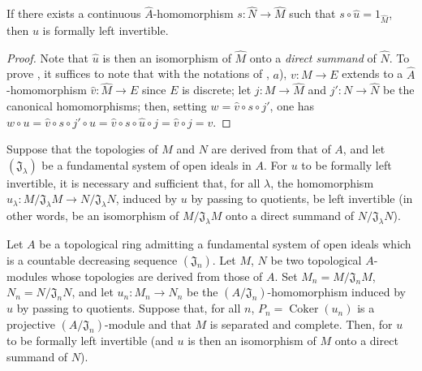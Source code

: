 \begin{corollary}[19.1.6]
\label{0.19.1.6}
If there exists a continuous $\widehat{A}$-homomorphism $s:\widehat{N}\to\widehat{M}$ such that $s\circ\hat{u}=1_{\widehat{M}}$, then $u$ is formally left invertible.
\end{corollary}

\begin{proof}
Note that $\hat{u}$ is then an isomorphism of $\widehat{M}$ onto a \emph{direct summand} of $\widehat{N}$.
To prove , it suffices to note that with the notations of , $a$), $v:M\to E$ extends to a $\widehat{A}$-homomorphism $\hat{v}:\widehat{M}\to E$ since $E$ is discrete;
let $j:M\to\widehat{M}$ and $j':N\to\widehat{N}$ be the canonical homomorphisms;
then, setting $w=\hat{v}\circ s\circ j'$, one has $w\circ u=\hat{v}\circ s\circ j'\circ u=\hat{v}\circ s\circ\hat{u}\circ j=\hat{v}\circ j=v$.
\end{proof}

\begin{corollary}[19.1.7]
\label{0.19.1.7}
Suppose that the topologies of $M$ and $N$ are derived from that of $A$, and let $(\mathfrak{J}_\lambda)$ be a fundamental system of open ideals in $A$.
For $u$ to be formally left invertible, it is necessary and sufficient that, for all $\lambda$, the homomorphism $u_\lambda:M/\mathfrak{J}_\lambda M\to N/\mathfrak{J}_\lambda N$, induced by $u$ by passing to quotients, be left invertible (in other words, be an isomorphism of $M/\mathfrak{J}_\lambda M$ onto a direct summand of $N/\mathfrak{J}_\lambda N$).
\end{corollary}

\begin{proposition}[19.1.8]
\label{0.19.1.8}
Let $A$ be a topological ring admitting a fundamental system of open ideals which is a countable decreasing sequence $(\mathfrak{J}_n)$.
Let $M$, $N$ be two topological $A$-modules whose topologies are derived from those of $A$.
Set $M_n=M/\mathfrak{J}_n M$, $N_n=N/\mathfrak{J}_n N$, and let $u_n:M_n\to N_n$ be the $(A/\mathfrak{J}_n)$-homomorphism induced by $u$ by passing to quotients.
Suppose that, for all $n$, $P_n=\operatorname{Coker}(u_n)$ is a projective $(A/\mathfrak{J}_n)$-module and that $M$ is separated and complete.
Then, for $u$ to be formally left invertible (and $u$ is then an isomorphism of $M$ onto a direct summand of $N$).
\end{proposition}

